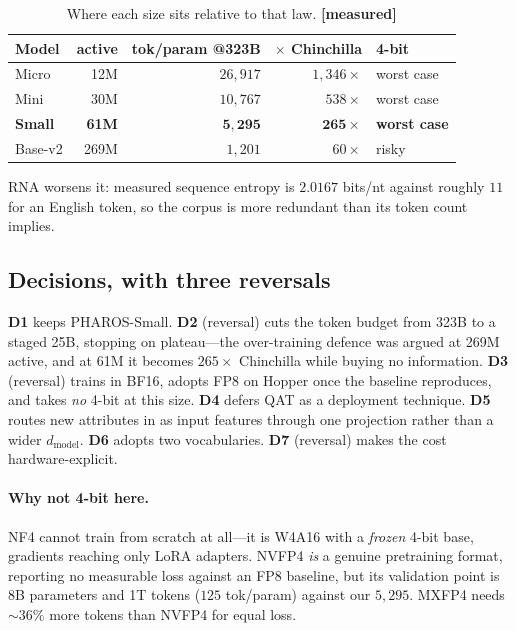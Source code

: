 \documentclass[11pt,a4paper]{article}
\newcommand{\meas}{\textcolor{measured}{\textbf{[measured]}}}
\begin{document}
\begin{table}[h]
\centering
\caption{Where each size sits relative to that law. \meas}
\begin{tabular}{lrrrl}
\toprule
\textbf{Model} & \textbf{active} & \textbf{tok/param @323B} & \textbf{$\times$ Chinchilla} & \textbf{4-bit} \\
\midrule
Micro & 12M & $26{,}917$ & $1{,}346\times$ & worst case \\
Mini & 30M & $10{,}767$ & $538\times$ & worst case \\
\textbf{Small} & \textbf{61M} & $\mathbf{5{,}295}$ & $\mathbf{265\times}$ & \textbf{worst case} \\
Base-v2 & 269M & $1{,}201$ & $60\times$ & risky \\
\bottomrule
\end{tabular}
\end{table}

RNA worsens it: measured sequence entropy is $2.0167$ bits/nt against roughly
$11$ for an English token, so the corpus is more redundant than its token count
implies.

\subsection{Decisions, with three reversals}

\textbf{D1} keeps PHAROS-Small. \textbf{D2} (reversal) cuts the token budget
from 323B to a staged 25B, stopping on plateau---the over-training defence was
argued at 269M active, and at 61M it becomes $265\times$ Chinchilla while buying
no information. \textbf{D3} (reversal) trains in BF16, adopts FP8 on Hopper once
the baseline reproduces, and takes \emph{no} 4-bit at this size. \textbf{D4}
defers QAT as a deployment technique. \textbf{D5} routes new attributes in as
input features through one projection rather than a wider $d_{\text{model}}$.
\textbf{D6} adopts two vocabularies. \textbf{D7} (reversal) makes the cost
hardware-explicit.

\paragraph{Why not 4-bit here.} NF4 cannot train from scratch at all---it is
W4A16 with a \emph{frozen} 4-bit base, gradients reaching only LoRA adapters.
NVFP4 \emph{is} a genuine pretraining format, reporting no measurable loss
against an FP8 baseline, but its validation point is 8B parameters and 1T tokens
($125$ tok/param) against our $5{,}295$. MXFP4 needs ${\sim}36\%$ more tokens
than NVFP4 for equal loss.
\end{document}
